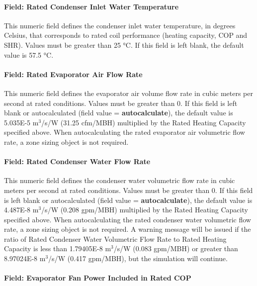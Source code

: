 \paragraph{Field: Rated Condenser Inlet Water Temperature}\label{field-rated-condenser-inlet-water-temperature}

This numeric field defines the condenser inlet water temperature, in degrees Celsius, that corresponds to rated coil performance (heating capacity, COP and SHR). Values must be greater than 25 °C. If this field is left blank, the default value is 57.5 °C.

\paragraph{Field: Rated Evaporator Air Flow Rate}\label{field-rated-evaporator-air-flow-rate}

This numeric field defines the evaporator air volume flow rate in cubic meters per second at rated conditions. Values must be greater than 0. If this field is left blank or autocalculated (field value = \textbf{autocalculate}), the default value is 5.035E-5 m\(^{3}\)/s/W (31.25 cfm/MBH) multiplied by the Rated Heating Capacity specified above. When autocalculating the rated evaporator air volumetric flow rate, a zone sizing object is not required.

\paragraph{Field: Rated Condenser Water Flow Rate}\label{field-rated-condenser-water-flow-rate}

This numeric field defines the condenser water volumetric flow rate in cubic meters per second at rated conditions. Values must be greater than 0. If this field is left blank or autocalculated (field value = \textbf{autocalculate}), the default value is 4.487E-8 m\(^{3}\)/s/W (0.208 gpm/MBH) multiplied by the Rated Heating Capacity specified above. When autocalculating the rated condenser water volumetric flow rate, a zone sizing object is not required. A warning message will be issued if the ratio of Rated Condenser Water Volumetric Flow Rate to Rated Heating Capacity is less than 1.79405E-8 m\(^{3}\)/s/W (0.083 gpm/MBH) or greater than 8.97024E-8 m\(^{3}\)/s/W (0.417 gpm/MBH), but the simulation will continue.

\paragraph{Field: Evaporator Fan Power Included in Rated COP}\label{field-evaporator-fan-power-included-in-rated-cop}

